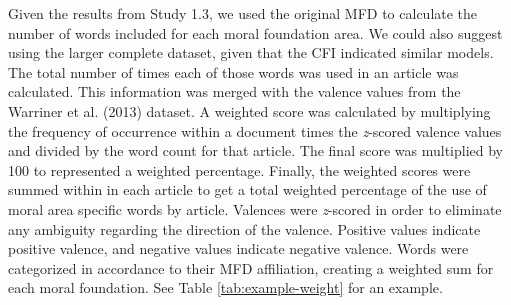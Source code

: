 \documentclass[
  man,floatsintext]{apa6}
\begin{document}
Given the results from Study 1.3, we used the original MFD to calculate
the number of words included for each moral foundation area. We could
also suggest using the larger complete dataset, given that the CFI indicated
similar models. The total number of times each of those words
was used in an article was calculated. This information was merged with
the valence values from the Warriner et al. (2013) dataset. A weighted score was
calculated by multiplying the frequency of occurrence within a document
times the \emph{z}-scored valence values and divided by the word count for
that article. The final score was multiplied by 100 to represented a
weighted percentage. Finally, the weighted scores were summed within in
each article to get a total weighted percentage of the use of moral area
specific words by article. Valences were \emph{z}-scored in order to
eliminate any ambiguity regarding the direction of the valence. Positive
values indicate positive valence, and negative values indicate negative
valence. Words were categorized in accordance to their MFD affiliation,
creating a weighted sum for each moral foundation. See Table
\ref{tab:example-weight} for an example.
\end{document}
